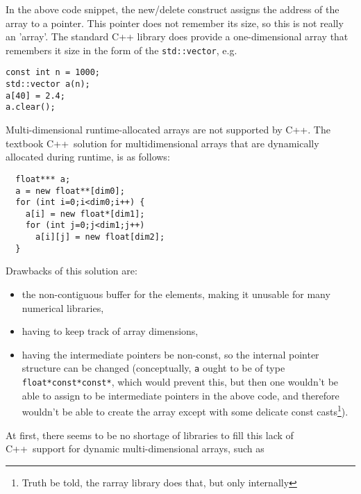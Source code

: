 \documentclass[11pt,twoside]{article}
\newcommand{\cxx}{C{++}}
\begin{document}
In the above code snippet, the new/delete construct assigns the address of the array to a pointer. This pointer does not remember its size, so this is not really an 'array'.  The standard C++ library does provide a one-dimensional array that remembers it size in the form of the \texttt{std::vector}, e.g.
\vspace{-5pt}\begin{framed}\vspace{-14pt}%
\begin{verbatim}
const int n = 1000;
std::vector a(n);
a[40] = 2.4;
a.clear();
\end{verbatim}%
\vspace{-12pt}\end{framed}\vspace{-5pt}%

Multi-dimensional runtime-allocated arrays are not supported by \cxx.
The textbook \cxx\ solution for multidimensional arrays that are
dynamically allocated during runtime, is as follows:
\vspace{-5pt}\begin{framed}\vspace{-14pt}%
\begin{verbatim}
  float*** a;
  a = new float**[dim0];
  for (int i=0;i<dim0;i++) {
    a[i] = new float*[dim1];
    for (int j=0;j<dim1;j++) 
      a[i][j] = new float[dim2];
  }
\end{verbatim}%
\vspace{-12pt}\end{framed}\vspace{-5pt}%
Drawbacks of this solution are:
\begin{itemize}
  \item the non-contiguous buffer for the elements, making it unusable
    for many numerical libraries,
  \item having to keep track of array dimensions,
  \item having the intermediate pointers be non-const, so the
    internal pointer structure can be changed
    (conceptually, \texttt{a} ought to be of type \texttt{float*const*const*}, which would prevent this, but then one wouldn't be able to
    assign to be intermediate pointers in the above code, and therefore wouldn't be able
    to create the array except with some delicate const casts\footnote{Truth
      be told, the rarray library does that, but only internally}).
\end{itemize}
At first, there seems to be no shortage of libraries to fill this
lack of \cxx\ support for dynamic multi-dimensional arrays, such as
\end{document}
